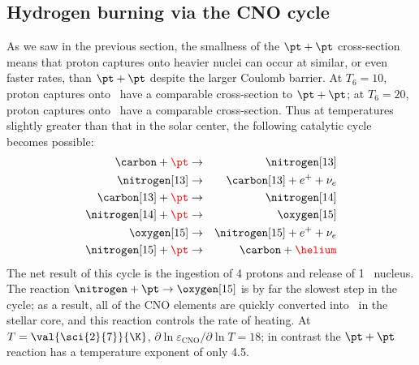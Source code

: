 \subsection{Hydrogen burning via the CNO cycle}

As we saw in the previous section, the smallness of the $\pt+\pt$ cross-section means that proton captures onto heavier nuclei can occur at similar, or even faster rates, than $\pt+\pt$ despite the larger Coulomb barrier. 
At $T_{6} = 10$, proton captures onto \carbon\ have a comparable cross-section to $\pt + \pt$; at $T_{6} = 20$, proton captures onto \oxygen\ have a comparable cross-section.
Thus at temperatures slightly greater than that in the solar center, the following catalytic cycle becomes possible:
\begin{eqnarray*}
\carbon + {\color{red}\pt} &\to& \nitrogen[13]\\
\nitrogen[13] &\to& \carbon[13] + e^{+} + \nu_{e}\\
\carbon[13] + {\color{red}\pt} &\to& \nitrogen[14]\\
\nitrogen[14] + {\color{red}\pt} &\to& \oxygen[15]\\
\oxygen[15] &\to& \nitrogen[15] + e^{+} + \nu_{e}\\
\nitrogen[15] + {\color{red}\pt} &\to& \carbon + {\color{red}\helium}
\end{eqnarray*}
The net result of this cycle is the ingestion of 4 protons and release of 1 \helium\ nucleus.
The reaction $\nitrogen+\pt\to\oxygen[15]$ is by far the slowest step in the cycle; as a result, all of the CNO elements are quickly converted into \nitrogen\ in the stellar core, and this reaction controls the rate of heating. At $T = \val{\sci{2}{7}}{\K}$, $\partial \ln \varepsilon_{\mathrm{CNO}}/\partial\ln T = 18$; in contrast the $\pt+\pt$ reaction has a temperature exponent of only 4.5.

